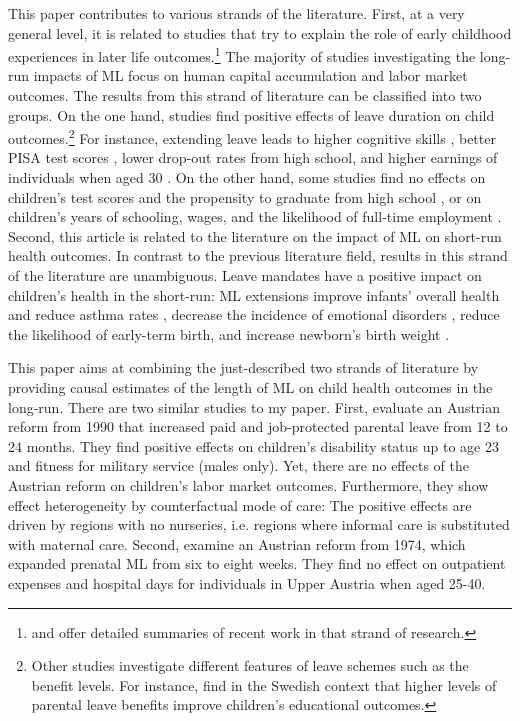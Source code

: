 \documentclass[11pt, a4paper, draft]{article} %
\begin{document}
This paper contributes to various strands of the literature. First, at a very general level, it is related to studies that try to explain the role of early childhood experiences in later life outcomes.\footnote{\cite{currie2011human} and \cite{almond2017childhood} offer detailed summaries of recent work in that strand of research.} The majority of studies investigating the long-run impacts of ML focus on human capital accumulation and labor market outcomes. The results from this strand of literature can be classified into two groups. On the one hand, studies find positive effects of leave duration on child outcomes.\footnote{Other studies investigate different features of leave schemes such as the benefit levels. For instance, \cite{ginja2020parental} find in the Swedish context that higher levels of parental leave benefits improve children's educational outcomes.} For instance, extending leave leads to higher cognitive skills \citep{albagli2018}, better PISA test scores \citep{danzer2017}, lower drop-out rates from high school, and higher earnings of individuals when aged 30 \citep{carneiro2015flying}. On the other hand, some studies find no effects on children's test scores and the propensity to graduate from high school \citep{Dahl2016Case}, or on children's years of schooling, wages, and the likelihood of full-time employment \citep{Dustmann2012}. Second, this article is related to the literature on the impact of ML on short-run health outcomes. In contrast to the previous literature field, results in this strand of the literature are unambiguous. Leave mandates have a positive impact on children's health in the short-run: ML extensions improve infants' overall health and reduce asthma rates \citep{bullinger2019effect}, decrease the incidence of emotional disorders \citep{sayour2019impact}, reduce the likelihood of early-term birth, and increase newborn's birth weight \citep{stearns2015effects}.



This paper aims at combining the just-described two strands of literature by providing causal estimates of the length of ML on child health outcomes in the long-run. There are two similar studies to my paper. First, \cite{danzer2019parental} evaluate an Austrian reform from 1990 that increased paid and job-protected parental leave from 12 to 24 months. They find positive effects on children's disability status up to age 23 and fitness for military service (males only). Yet, there are no effects of the Austrian reform on children's labor market outcomes. Furthermore, they show effect heterogeneity by counterfactual mode of care: The positive effects are driven by regions with no nurseries, i.e. regions where informal care is substituted with maternal care. Second, \cite{ahammer2020} examine an Austrian reform from 1974, which expanded prenatal ML from six to eight weeks. They find no effect on outpatient expenses and hospital days for individuals in Upper Austria when aged 25-40.
\end{document}
